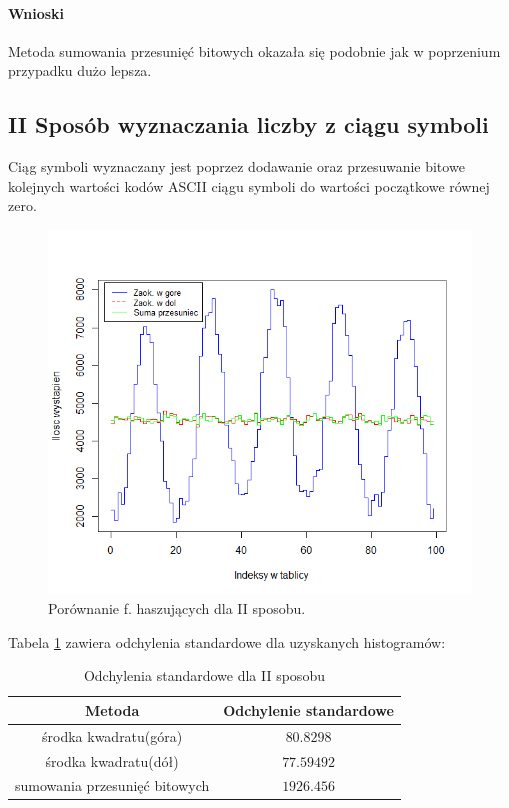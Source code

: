 \documentclass{article}
\begin{document}
			\paragraph{Wnioski}
		Metoda sumowania przesunięć bitowych okazała się podobnie jak w poprzenium przypadku dużo lepsza. 
		\subsection{II Sposób wyznaczania liczby z ciągu symboli}\label{p3}
			Ciąg symboli wyznaczany jest poprzez dodawanie oraz przesuwanie bitowe kolejnych wartości kodów ASCII ciągu symboli do wartości początkowe równej zero. 
			\begin{figure}[h]
				\includegraphics[width=\linewidth]{3.png}
				\caption{Porównanie f. haszujących dla II sposobu.}
			\end{figure}
			Tabela \ref{sp2} zawiera odchylenia standardowe dla uzyskanych histogramów:
			\begin{table}
			\centering
			\label{sp2}
			\caption{Odchylenia standardowe dla II sposobu}
			\begin{tabular}{|c|c|}					
				\hline
				Metoda & Odchylenie standardowe \\\hline\hline 
				środka kwadratu(góra)& $80.8298$ \\\hline  
				środka kwadratu(dół)	& $77.59492$ \\\hline  
				sumowania przesunięć bitowych & $1926.456$\\\hline 								
			\end{tabular} 		
			\end{table}
			
\end{document}
